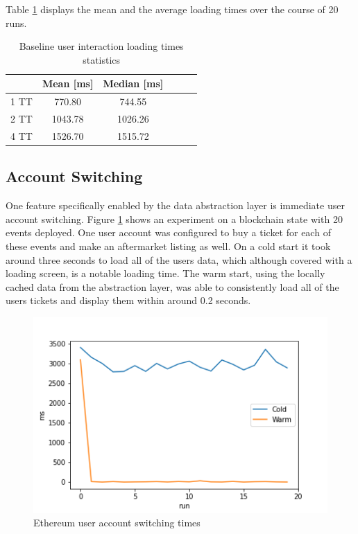 Table \ref{tab:baseline1} displays the mean and the average loading times over the course of 20 runs.


\begin{table}[ht]
\centering
\begin{tabular}{|c|c|c|c|c|c|}
\hline
 & \textbf{Mean [ms]} & \textbf{Median [ms]} \\ \hline
1 TT & 770.80             & 744.55      \\ \hline
2 TT & 1043.78             & 1026.26       \\ \hline
4 TT & 1526.70               & 1515.72        \\ \hline
\end{tabular}
\caption{Baseline user interaction loading times statistics}
\label{tab:baseline1}
\end{table}


\subsection{Account Switching}\label{section:account-switching}

One feature specifically enabled by the data abstraction layer is immediate user account switching. Figure \ref{img:user_int} shows an experiment on a blockchain state with 20 events deployed. One user account was configured to buy a ticket for each of these events and make an aftermarket listing as well. On a cold start it took around three seconds to load all of the users data, which although covered with a loading screen, is a notable loading time. The warm start, using the locally cached data from the abstraction layer, was able to consistently load all of the users tickets and display them within around 0.2 seconds.

\begin{figure}[H]
    \centering
    \includegraphics[width=14cm]{images/plot3.png}
    \caption{Ethereum user account switching times \protect\footnotemark}
    \label{img:user_int}
\end{figure}

